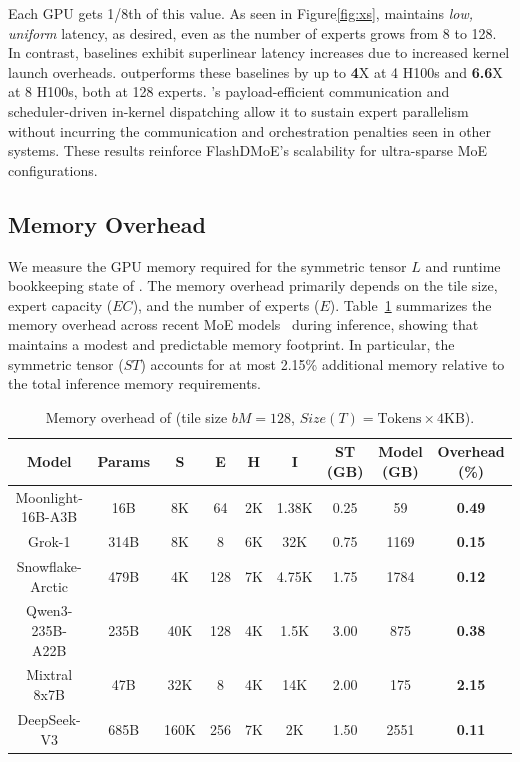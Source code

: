 Each GPU gets 1/8th of this value.
As seen in Figure\ref{fig:xs}, \sysname maintains \emph{low, uniform} latency, as desired,
even as the number of experts grows from 8 to 128.
In contrast, baselines exhibit superlinear latency increases due to increased kernel launch overheads.
\sysname outperforms these baselines by up to \textbf{4}X at 4 H100s and \textbf{6.6}X at 8 H100s, both at 128 experts.
\sysname’s payload-efficient communication and scheduler-driven
in-kernel dispatching allow it to sustain expert parallelism
without incurring the communication and orchestration penalties seen in other systems.
These results reinforce FlashDMoE’s scalability for ultra-sparse MoE configurations.

\subsection{Memory Overhead}\label{sec:eval:memory}
We measure the GPU memory required for the symmetric tensor $L$ and runtime bookkeeping state of \sysname.
The memory overhead primarily depends on the tile size, expert capacity ($EC$), and the number of experts ($E$).
Table~\ref{tab:memory-overhead} summarizes the memory overhead across recent MoE models~\cite{moonlight,grok,snowflake-arctic,qwen3,mixtral,deepseek} during inference, showing that \sysname maintains a modest and predictable memory footprint.
In particular, the symmetric tensor ($ST$) accounts for at most 2.15\% additional memory relative to the total inference memory requirements.
\begin{table}[!ht]
    \centering
    \caption{Memory overhead of \sysname (tile size $bM = 128$, $Size(T) = \text{Tokens} \times 4\text{KB}$).}
    \label{tab:memory-overhead}
    \small
    \setlength{\tabcolsep}{5pt}
    \renewcommand{\arraystretch}{0.9}
    \begin{tabular}{ccccccccc}
        \toprule
        \textbf{Model} & \textbf{Params} & \textbf{S} & \textbf{E} & \textbf{H} & \textbf{I} & \textbf{ST (GB)} & \textbf{Model (GB)} & \textbf{Overhead (\%)} \\
        \midrule
        Moonlight-16B-A3B  & 16B  & 8K   & 64   & 2K   & 1.38K  & 0.25  & 59    & \textbf{0.49} \\
        Grok-1             & 314B & 8K   & 8    & 6K   & 32K     & 0.75  & 1169  & \textbf{0.15} \\
        Snowflake-Arctic   & 479B & 4K   & 128  & 7K   & 4.75K   & 1.75  & 1784  & \textbf{0.12} \\
        Qwen3-235B-A22B    & 235B & 40K  & 128  & 4K   & 1.5K    & 3.00  & 875   & \textbf{0.38} \\
        Mixtral 8x7B       & 47B  & 32K  & 8    & 4K   & 14K     & 2.00  & 175   & \textbf{2.15} \\
        DeepSeek-V3        & 685B & 160K & 256  & 7K   & 2K      & 1.50  & 2551  & \textbf{0.11} \\
        \bottomrule
    \end{tabular}
    \vspace{-0.4cm}
\end{table}
